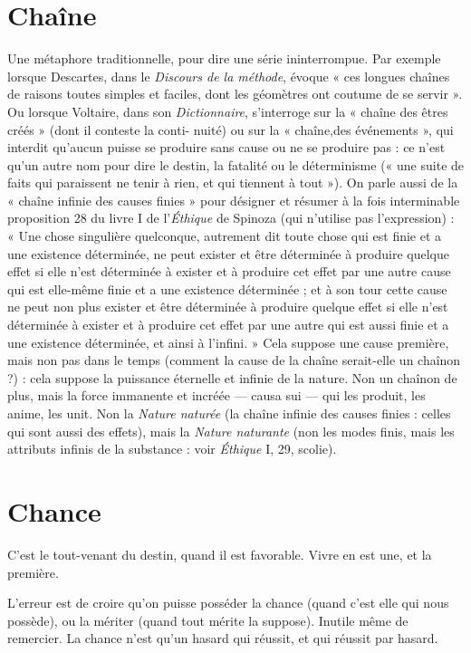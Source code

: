 \section{Chaîne}
Une métaphore traditionnelle, pour dire une série ininterrompue.
Par exemple lorsque Descartes, dans le {\it Discours de la
méthode}, évoque « ces longues chaînes de raisons toutes simples et faciles, dont
les géomètres ont coutume de se servir ». Ou lorsque Voltaire, dans son {\it Dictionnaire},
s'interroge sur la « chaîne des êtres créés » (dont il conteste la conti-
nuité) ou sur la « chaîne,des événements », qui interdit qu'aucun puisse se produire
sans cause ou ne se produire pas : ce n’est qu’un autre nom pour dire le
destin, la fatalité ou le déterminisme (« une suite de faits qui paraissent ne tenir
à rien, et qui tiennent à tout »). On parle aussi de la « chaîne infinie des causes
finies » pour désigner et résumer à la fois interminable proposition 28 du
livre I de l'{\it Éthique} de Spinoza (qui n'utilise pas l'expression) : « Une chose singulière
quelconque, autrement dit toute chose qui est finie et a une existence
déterminée, ne peut exister et être déterminée à produire quelque effet si elle
n’est déterminée à exister et à produire cet effet par une autre cause qui est elle-même
finie et a une existence déterminée ; et à son tour cette cause ne peut non
plus exister et être déterminée à produire quelque effet si elle n’est déterminée
à exister et à produire cet effet par une autre qui est aussi finie et a une existence
déterminée, et ainsi à l’infini. » Cela suppose une cause première, mais non pas
dans le temps (comment la cause de la chaîne serait-elle un chaînon ?) : cela
suppose la puissance éternelle et infinie de la nature. Non un chaînon de plus,
mais la force immanente et incréée — causa sui — qui les produit, les anime, les
unit. Non la {\it Nature naturée} (la chaîne infinie des causes finies : celles qui sont
aussi des effets), mais la {\it Nature naturante} (non les modes finis, mais les attributs
infinis de la substance : voir {\it Éthique} I, 29, scolie).

\section{Chance}
C'est le tout-venant du destin, quand il est favorable. Vivre en est
une, et la première.

L'erreur est de croire qu’on puisse posséder la chance (quand c’est elle qui
nous possède), ou la mériter (quand tout mérite la suppose). Inutile même de
remercier. La chance n’est qu’un hasard qui réussit, et qui réussit par hasard.

